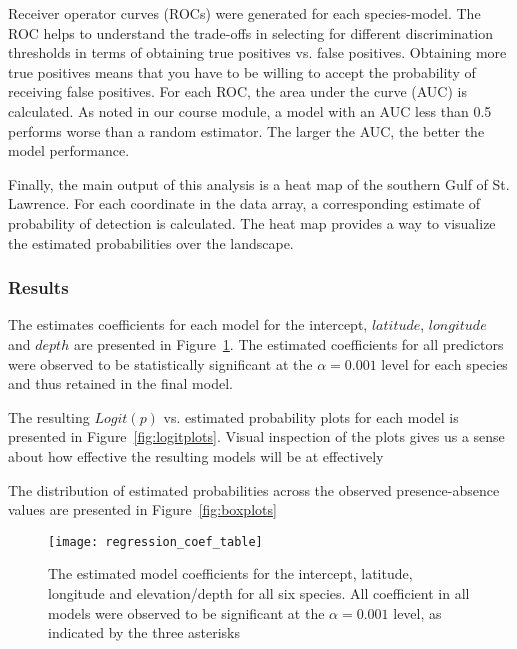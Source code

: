 Receiver operator curves (ROCs) were generated for each species-model.
The ROC helps to understand the trade-offs in selecting for different discrimination thresholds in terms of obtaining true positives vs.
false positives.
Obtaining more true positives means that you have to be willing to accept the probability of receiving false positives.
For each ROC, the area under the curve (AUC) is calculated.
As noted in our course module, a model with an AUC less than 0.5 performs worse than a random estimator.
The larger the AUC, the better the model performance.

Finally, the main output of this analysis is a heat map of the southern Gulf of St. Lawrence.
For each coordinate in the data array, a corresponding estimate of probability of detection is calculated.
The heat map provides a way to visualize the estimated probabilities over the landscape.



\subsubsection{Results}

The estimates coefficients for each model for the intercept, $latitude$, $longitude$ and $depth$ are presented in Figure~\ref{fig:reg_coefs}.
The estimated coefficients for all predictors were observed to be statistically significant at the $\alpha=0.001$ level for each species
and thus retained in the final model.

The resulting $Logit(p)$ vs. estimated probability plots for each model is presented in Figure~\ref{fig:logitplots}.
Visual inspection of the plots gives us a sense about how effective the resulting models will be at effectively

The distribution of estimated probabilities across the observed presence-absence values are presented in Figure~\ref{fig:boxplots}





\begin{figure}
    \texttt{[image: regression\_coef\_table]}
    \caption{
        The estimated model coefficients for the intercept, latitude, longitude and elevation/depth for all six species.
        All coefficient in all models were observed to be significant at the $\alpha=0.001$ level, as indicated by the three asterisks
    }
    \label{fig:reg_coefs}
\end{figure}




